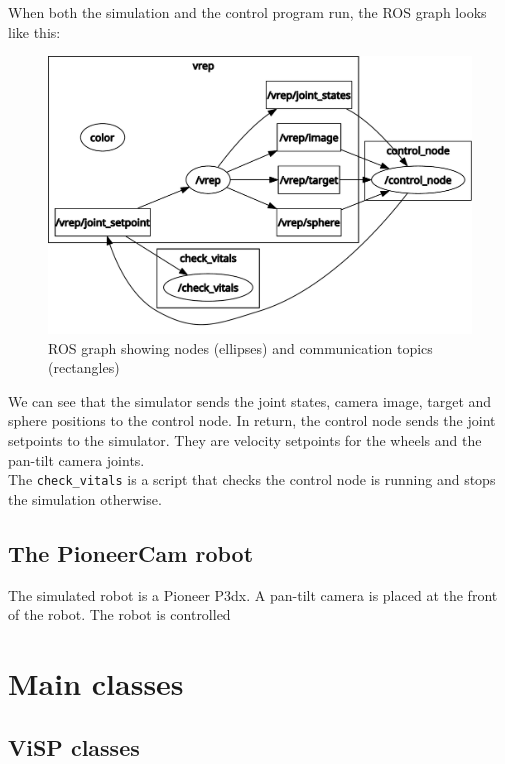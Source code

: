 \documentclass{ecnreport}
\begin{document}
When both the simulation and the control program run, the ROS graph looks like this:

\begin{figure}[h!]\centering
 \includegraphics[width=.8\linewidth]{rosgraph}
 \caption{ROS graph showing nodes (ellipses) and communication topics (rectangles)}
 \label{fig:rosgraph}
\end{figure}

We can see that the simulator sends the joint states, camera image, target and sphere positions to the control node. In return, the control node sends the joint setpoints
to the simulator. They are velocity setpoints for the wheels and the pan-tilt camera joints.\\
The \texttt{check\_vitals} is a script that checks the control node is running and stops the simulation otherwise.


\subsection{The PioneerCam robot}

The simulated robot is a Pioneer P3dx. A pan-tilt camera is placed at the front of the robot. The robot is controlled 


\appendix

\section{Main classes}\label{sec:classes}

\subsection{ViSP classes}
\end{document}
